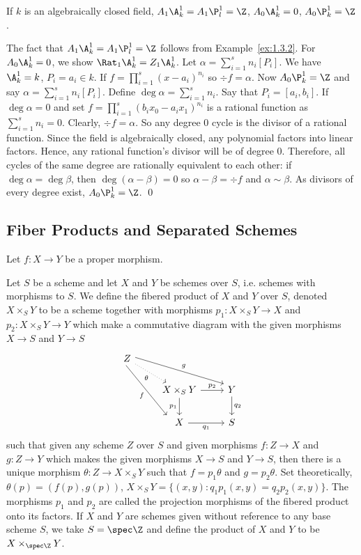 \begin{prop}
If $k$ is an algebraically closed field, $A_1 \A_k^1=A_1 \P_l^1=\Z$, $A_0\A_k^1=0$, $A_0 \P_k^1=\Z$.
\end{prop}

\pf The fact that $A_1 \A_k^1=A_1 \P_l^1=\Z$ follows from Example~\ref{ex:1.3.2}. For $A_0 \A_k^1=0$, we show $\Rat_1 \A_k^1=Z_1 \A_k^1$. Let $\alpha= \sum_{i=1}^s n_i [P_i]$. We have $\A_k^1=k$, $P_i=a_i \in k$. If $f=\prod_{i=1}^s (x - a_i)^{n_i}$ so $\div f= \alpha$. Now $A_0\P_k^1=\Z$ and say $\alpha= \sum_{i=1}^s n_i[P_i]$. Define $\deg \alpha = \sum_{i=1}^s n_i$. Say that $P_i=[a_i,b_i]$. If $\deg \alpha=0$ and set $f= \prod_{i=1}^s (b_ix_0 - a_ix_1)^{n_i}$ is a rational function as $\sum_{i=1}^s n_i=0$. Clearly, $\div f=\alpha$. So any degree 0 cycle is the divisor of a rational function. Since the field is algebraically closed, any polynomial factors into linear factors. Hence, any rational function's divisor will be of degree 0. Therefore, all cycles of the same degree are rationally equivalent to each other: if $\deg \alpha = \deg \beta$, then $\deg(\alpha-\beta)=0$ so $\alpha - \beta= \div f$ and $\alpha \sim \beta$. As divisors of every degree exist, $A_0 \P_k^1=\Z$. \qed \\


\subsection{Fiber Products and Separated Schemes}

Let $f: X \to Y$ be a proper morphism. 

\begin{dfn}
Let $S$ be a scheme and let $X$ and $Y$ be schemes over $S$, i.e. schemes with morphisms to $S$. We define the fibered product of $X$ and $Y$ over $S$, denoted $X \times_S Y$ to be a scheme together with morphisms $p_1: X \times_S Y \to X$ and $p_2: X \times_S Y \to Y$ which make a commutative diagram with the given morphisms $X \to S$ and $Y \to S$
	\[
	\begin{tikzcd}
	Z \arrow[yshift=1ex]{drr}{g} \arrow[dotted,swap]{dr}{\theta} \arrow[swap,xshift=-1.5ex]{ddr}{f} & & \\
	& X \times_S Y \arrow{r}{p_2} \arrow[swap]{d}{p_1} & Y \arrow{d}{q_2} \\
	& X \arrow[swap]{r}{q_1} & S
	\end{tikzcd}
	\]
such that given any scheme $Z$ over $S$ and given morphisms $f: Z \to X$ and $g: Z \to Y$ which makes the given morphisms $X \to S$ and $Y \to S$, then there is a unique morphism $\theta: Z \to X \times_S Y$ such that $f=p_1 \theta$ and $g= p_2 \theta$. Set theoretically, $\theta(p)=(f(p),g(p))$, $X \times_S Y=\{(x,y) \colon q_1p_1(x,y)=q_2p_2(x,y)\}$. The morphisms $p_1$ and $p_2$ are called the projection morphisms of the fibered product onto its factors. If $X$ and $Y$ are schemes given without reference to any base scheme $S$, we take $S=\spec \Z$ and define the product of $X$ and $Y$ to be $X \times_{\spec \Z} Y$.
\end{dfn}


